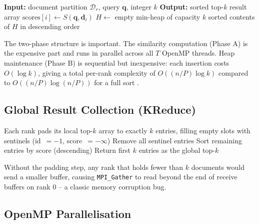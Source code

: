 \documentclass[12pt,a4paper]{article}
\begin{document}
\begin{algorithm}[H]
\caption{Local Top-K Selection (executed on every MPI rank)}
\begin{algorithmic}[1]
\State \textbf{Input:} document partition $\mathcal{D}_r$, query
       $\mathbf{q}$, integer $k$
\State \textbf{Output:} sorted top-$k$ result array
    \State $\mathrm{scores}[i] \gets S(\mathbf{q},\mathbf{d}_i)$
\EndFor
{}
\State $H \gets$ empty min-heap of capacity $k$
    \State {}
\EndFor
\State \Return sorted contents of $H$ in descending order
\end{algorithmic}
\end{algorithm}

The two-phase structure is important. The similarity computation
(Phase A) is the expensive part and runs in parallel across all $T$
OpenMP threads. Heap maintenance (Phase B) is sequential but inexpensive:
each insertion costs $O(\log k)$, giving a total per-rank complexity of
$O((n/P)\log k)$ compared to $O((n/P)\log(n/P))$ for a full sort
\cite{cormen2022algorithms}.

\subsection{Global Result Collection (KReduce)}

\begin{algorithm}[H]
\caption{KReduce: Collecting Global Top-K}
\begin{algorithmic}[1]
\State Each rank pads its local top-$k$ array to exactly $k$ entries,
       filling empty slots with sentinels (id~$= -1$, score~$= -\infty$)
\State {}
    \State Remove all sentinel entries
    \State Sort remaining entries by score (descending)
    \State Return first $k$ entries as the global top-$k$
\EndIf
\end{algorithmic}
\end{algorithm}

Without the padding step, any rank that holds fewer than $k$ documents
would send a smaller buffer, causing \texttt{MPI\_Gather} to read
beyond the end of receive buffers on rank 0 -- a classic memory
corruption bug.

\subsection{OpenMP Parallelisation}
\end{document}
